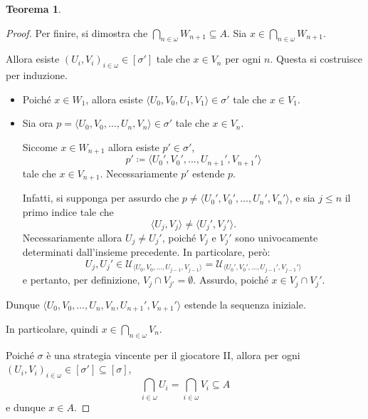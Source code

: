\documentclass[titlepage]{article}
\newcommand{\1}{\mathds{1}}
\theoremstyle{definition}%
\newtheorem{thm}{Teorema}[section]
\theoremstyle{plain}
\theoremstyle{remark}
\begin{document}
\begin{thm}
\begin{proof}
Per finire, si dimostra che \(\bigcap_{n \in \omega} W_{n+1} \subseteq A\). Sia \(x \in \bigcap_{n \in \omega} W_{n+1}\).

Allora esiste \((U_{i}, V_{i})_{i \in \omega} \in [\sigma']\) tale che \(x \in V_{n}\) per ogni \(n\). Questa si costruisce per induzione.
\begin{itemize}
\item Poiché \(x \in W_{1}\), allora esiste \(\langle U_{0},V_{0},U_{1},V_{1}\rangle \in \sigma'\) tale che \(x \in V_{1}\).
\item Sia ora \(p=\langle U_{0},V_{0},\dots,U_{n}, V_{n}\rangle \in\sigma'\) tale che \(x \in V_{n}\).

Siccome \(x \in W_{n+1}\) allora esiste \(p' \in\sigma'\),
\begin{equation*}
  p'\coloneqq \langle U_{0}',V_{0}',\dots,U_{n+1}',V_{n+1}'\rangle
\end{equation*}
tale che \(x \in V_{n+1}\). Necessariamente \(p'\) estende \(p\).

Infatti, si supponga per assurdo che \(p \neq \langle U_{0}',V_{0}',\dots,U_{n}',V_{n}'\rangle\), e sia \(j\le n\) il primo indice tale che
\begin{equation*}
  \langle U_{j}, V_{j}\rangle \neq \langle U_{j}', V_{j}'\rangle.
\end{equation*}
Necessariamente allora \(U_{j}\neq U_{j}'\), poiché \(V_{j}\) e \(V_{j}'\) sono univocamente determinati dall'insieme precedente. In particolare, però:
\begin{equation*}
  U_{j}, U_{j}' \in \mathcal{U}_{\langle U_{0},V_{0},\dots,U_{j-1},V_{j-1}\rangle} = \mathcal{U}_{\langle U_{0}',V_{0}',\dots,U_{j-1}',V_{j-1}'\rangle}
\end{equation*}
e pertanto, per definizione, \(V_{j}\cap V_{j'} = \emptyset\). Assurdo, poiché \(x \in V_{j}\cap V_{j}'\).
\end{itemize}

Dunque \(\langle U_{0},V_{0},\dots,U_{n}, V_{n}, U_{n+1}', V_{n+1}'\rangle\) estende la sequenza iniziale.

In particolare, quindi \(x \in \bigcap_{n \in \omega} V_{n}\).

Poiché \(\sigma\) è una strategia vincente per il giocatore II, allora per ogni \((U_{i}, V_{i})_{i \in \omega} \in [\sigma'] \subseteq [\sigma]\),
\begin{equation*}
\bigcap_{i \in \omega} U_{i} = \bigcap_{i \in \omega} V_{i}\subseteq A
\end{equation*}
e dunque \(x \in A\).
\end{proof}


\end{thm}
\end{document}
